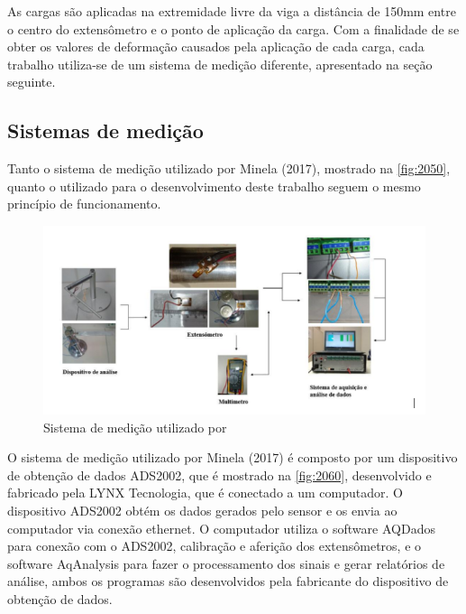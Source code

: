 As cargas são aplicadas na extremidade livre da viga a distância de 150mm entre o centro do extensômetro e o ponto de aplicação da carga.
Com a finalidade de se obter os valores de deformação causados pela aplicação de cada carga, cada trabalho utiliza-se de um sistema de medição diferente, apresentado
na seção seguinte.

\subsection{Sistemas de medição}

Tanto o sistema de medição utilizado por Minela (2017), mostrado na \autoref{fig:2050}, quanto o utilizado para o desenvolvimento deste trabalho seguem o mesmo princípio de funcionamento.

\begin{figure}[htb]
	\caption{\label{fig:2050} Sistema de medição utilizado por \autocite{Minela2017}}
	\begin{center}
		\includegraphics[width=\textwidth]{pictures/2050.png}
	\end{center}
\end{figure}

O sistema de medição utilizado por Minela (2017) é composto por um dispositivo de obtenção de dados ADS2002, que é mostrado na \autoref{fig:2060},
desenvolvido e fabricado pela LYNX Tecnologia, que é conectado a um computador.
O dispositivo ADS2002 obtém os dados gerados pelo sensor e os envia ao computador via conexão ethernet.
O computador utiliza o software AQDados para conexão com o ADS2002, calibração e aferição dos extensômetros, e o software AqAnalysis para fazer o processamento dos sinais
e gerar relatórios de análise, ambos os programas são desenvolvidos pela fabricante do dispositivo de obtenção de dados.

